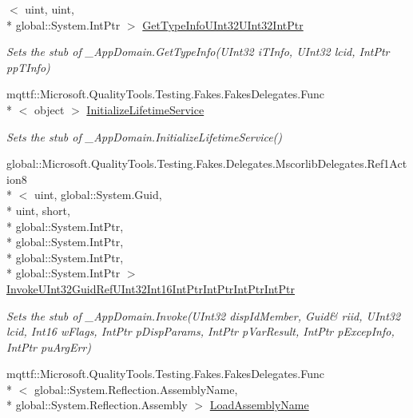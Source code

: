 \begin{DoxyCompactItemize}
$<$ uint, uint, \\*
global\-::\-System.\-Int\-Ptr $>$ \hyperlink{class_system_1_1_fakes_1_1_stub___app_domain_a998741b9b07c77c5caf1ff2bb3ea534e}{Get\-Type\-Info\-U\-Int32\-U\-Int32\-Int\-Ptr}
\begin{DoxyCompactList}\small\item\em Sets the stub of \-\_\-\-App\-Domain.\-Get\-Type\-Info(\-U\-Int32 i\-T\-Info, U\-Int32 lcid, Int\-Ptr pp\-T\-Info)\end{DoxyCompactList}\item 
mqttf\-::\-Microsoft.\-Quality\-Tools.\-Testing.\-Fakes.\-Fakes\-Delegates.\-Func\\*
$<$ object $>$ \hyperlink{class_system_1_1_fakes_1_1_stub___app_domain_ae3d95a932506a2838cd596b37ac20181}{Initialize\-Lifetime\-Service}
\begin{DoxyCompactList}\small\item\em Sets the stub of \-\_\-\-App\-Domain.\-Initialize\-Lifetime\-Service()\end{DoxyCompactList}\item 
global\-::\-Microsoft.\-Quality\-Tools.\-Testing.\-Fakes.\-Delegates.\-Mscorlib\-Delegates.\-Ref1\-Action8\\*
$<$ uint, global\-::\-System.\-Guid, \\*
uint, short, \\*
global\-::\-System.\-Int\-Ptr, \\*
global\-::\-System.\-Int\-Ptr, \\*
global\-::\-System.\-Int\-Ptr, \\*
global\-::\-System.\-Int\-Ptr $>$ \hyperlink{class_system_1_1_fakes_1_1_stub___app_domain_a63c2abe47849f38271334472e231ef3c}{Invoke\-U\-Int32\-Guid\-Ref\-U\-Int32\-Int16\-Int\-Ptr\-Int\-Ptr\-Int\-Ptr\-Int\-Ptr}
\begin{DoxyCompactList}\small\item\em Sets the stub of \-\_\-\-App\-Domain.\-Invoke(U\-Int32 disp\-Id\-Member, Guid\& riid, U\-Int32 lcid, Int16 w\-Flags, Int\-Ptr p\-Disp\-Params, Int\-Ptr p\-Var\-Result, Int\-Ptr p\-Excep\-Info, Int\-Ptr pu\-Arg\-Err)\end{DoxyCompactList}\item 
mqttf\-::\-Microsoft.\-Quality\-Tools.\-Testing.\-Fakes.\-Fakes\-Delegates.\-Func\\*
$<$ global\-::\-System.\-Reflection.\-Assembly\-Name, \\*
global\-::\-System.\-Reflection.\-Assembly $>$ \hyperlink{class_system_1_1_fakes_1_1_stub___app_domain_a0244f80214ed7f051c2e41fb16d95ebe}{Load\-Assembly\-Name}

\end{DoxyCompactItemize}
